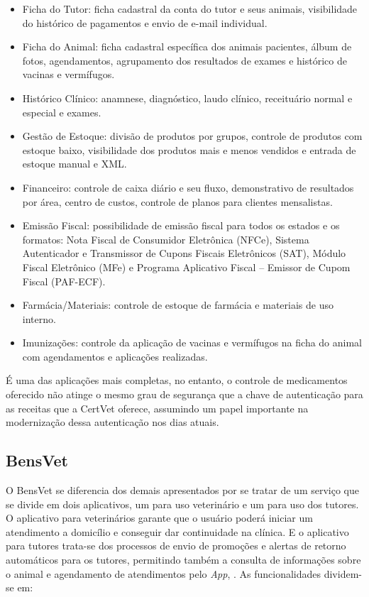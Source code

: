 \documentclass[
    12pt,               %
    openright,          %
    oneside,
    a4paper,            %
    BIBLATEX,           %
    TODO,               %
    english,            %
    brazil              %
    ]{ifsp-spo-inf-ctds}
\begin{document}
\begin{itemize}
    \item Ficha do Tutor: ficha cadastral da conta do tutor e seus animais, visibilidade do histórico de pagamentos e envio de e-mail individual.
    \item Ficha do Animal: ficha cadastral específica dos animais pacientes, álbum de fotos, agendamentos, agrupamento dos resultados de exames e histórico de vacinas e vermífugos.
    \item Histórico Clínico: anamnese, diagnóstico, laudo clínico, receituário normal e especial e exames.
    \item Gestão de Estoque: divisão de produtos por grupos, controle de produtos com estoque baixo, visibilidade dos produtos mais e menos vendidos e entrada de estoque manual e XML.
    \item Financeiro: controle de caixa diário e seu fluxo, demonstrativo de resultados por área, centro de custos, controle de planos para clientes mensalistas.
    \item Emissão Fiscal: possibilidade de emissão fiscal para todos os estados e os formatos: Nota Fiscal de Consumidor Eletrônica (NFCe), Sistema Autenticador e Transmissor de Cupons Fiscais Eletrônicos (SAT), Módulo Fiscal Eletrônico (MFe) e Programa Aplicativo Fiscal – Emissor de Cupom Fiscal (PAF-ECF).
    \item Farmácia/Materiais: controle de estoque de farmácia e materiais de uso interno.
    \item Imunizações: controle da aplicação de vacinas e vermífugos na ficha do animal com agendamentos e aplicações realizadas.
\end{itemize}

    É uma das aplicações mais completas, no entanto, o controle de medicamentos oferecido não atinge o mesmo grau de segurança que a chave de autenticação para as receitas que a CertVet oferece, assumindo um papel importante na modernização dessa autenticação nos dias atuais.

        \subsection{BensVet}
        O BensVet se diferencia dos demais apresentados por se tratar de um serviço que se divide em dois aplicativos, um para uso veterinário e um para uso dos tutores. O aplicativo para veterinários garante que o usuário poderá iniciar um atendimento a domicílio e conseguir  dar continuidade na clínica. E o aplicativo para tutores trata-se dos processos de envio  de promoções e alertas de retorno automáticos para os tutores, permitindo também a consulta de  informações sobre o animal e agendamento de atendimentos pelo \emph{App},  . As funcionalidades dividem-se em:
\end{document}
